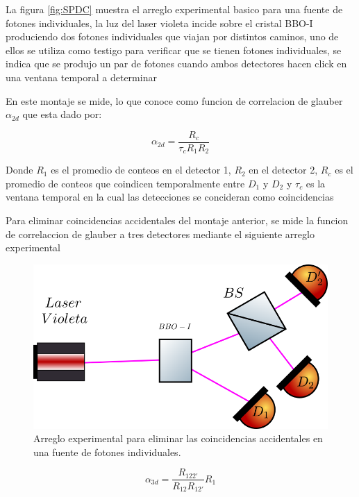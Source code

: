 \documentclass[11pt]{article}
\begin{document}
La figura \ref{fig:SPDC} muestra el arreglo experimental basico para una fuente de fotones individuales, la luz del laser violeta incide sobre el cristal BBO-I produciendo dos fotones individuales que viajan por distintos caminos, uno de ellos se utiliza como testigo para verificar que se tienen fotones individuales, se indica que se produjo un par de fotones cuando ambos detectores hacen click en una ventana temporal a determinar
 
En este montaje se mide, lo que conoce como funcion de correlacion de glauber $\alpha_{2d}$ \cite{pearson} que esta dado por:

\begin{equation}
\alpha_{2d}=\frac{R_{c}}{\tau_{c}R_{1} R_{2}}
\end{equation}

Donde $R_{1}$ es el promedio  de conteos en el detector 1, $R_{2}$ en el detector 2, $R_{c}$ es el promedio de conteos que coindicen temporalmente entre $D_{1}$ y $D_{2}$  y $\tau_{c}$ es la ventana temporal en la cual las detecciones se concideran como coincidencias

Para eliminar coincidencias accidentales del montaje anterior, se mide la funcion de correlaccion de glauber a tres detectores mediante el siguiente arreglo experimental


\begin{figure}[H]
\centering
\includegraphics[width=\linewidth]{images/acceso.png}
\caption{Arreglo experimental para eliminar las coincidencias accidentales en una fuente de fotones individuales.}
\label{fig:SPDC2}
\end{figure}

\begin{equation}
\alpha_{3d}=\frac{R_{122'}}{R_{12}R_{12'}}R_{1}
\end{equation}
\end{document}
